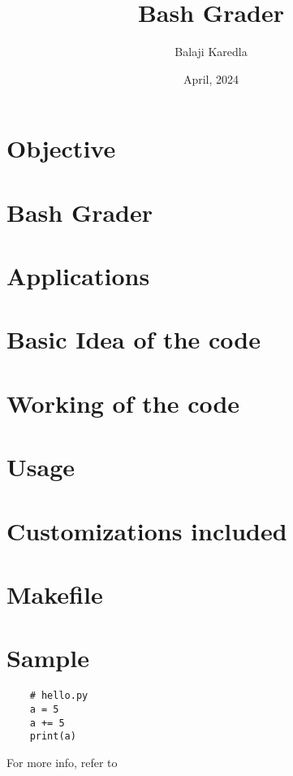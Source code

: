 \documentclass{article}
\title{Bash Grader}
\author{Balaji Karedla}
\date{April, 2024}
\begin{document}

\maketitle

\pagebreak
{}

\tableofcontents

\pagebreak
{}

\section{Objective}
\section{Bash Grader}
\section{Applications}
\section{Basic Idea of the code}
\section{Working of the code}
\section{Usage}
\section{Customizations included}
\section{Makefile}
\section{Sample}

\begin{lstlisting}
    # hello.py
    a = 5
    a += 5
    print(a)
\end{lstlisting}

For more info, refer to~\cite{balaji}

\printbibliography{}
\end{document}
